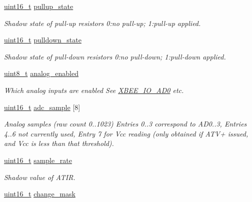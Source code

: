 \begin{DoxyCompactItemize}
\hyperlink{group__hal__dos_ga5a8b2dc9e45a9ee81a94ef304fb62505}{uint16\+\_\+t} \hyperlink{group__xbee__io_gae74f9326ff51e03bd7ae5d2c85c08f9e}{pullup\+\_\+state}
\begin{DoxyCompactList}\small\item\em Shadow state of pull-\/up resistors 0\+:no pull-\/up; 1\+:pull-\/up applied. \end{DoxyCompactList}\item 
\hyperlink{group__hal__dos_ga5a8b2dc9e45a9ee81a94ef304fb62505}{uint16\+\_\+t} \hyperlink{group__xbee__io_gab7b8b762841906ebf44fe90a3194d20c}{pulldown\+\_\+state}
\begin{DoxyCompactList}\small\item\em Shadow state of pull-\/down resistors 0\+:no pull-\/down; 1\+:pull-\/down applied. \end{DoxyCompactList}\item 
\hyperlink{group__hal__dos_gae1affc9ca37cfb624959c866a73f83c2}{uint8\+\_\+t} \hyperlink{group__xbee__io_ga8473837f97f54ee29f09cd8f9c15e084}{analog\+\_\+enabled}
\begin{DoxyCompactList}\small\item\em Which analog inputs are enabled See \hyperlink{group__xbee__io_gafc56816e62b0dd0a8d981b08f5f29651}{X\+B\+E\+E\+\_\+\+I\+O\+\_\+\+A\+D0} etc. \end{DoxyCompactList}\item 
\hyperlink{group__hal__dos_ga5a8b2dc9e45a9ee81a94ef304fb62505}{uint16\+\_\+t} \hyperlink{group__xbee__io_ga51a638af480039b3c6578b36b5ad44f0}{adc\+\_\+sample} \mbox{[}8\mbox{]}
\begin{DoxyCompactList}\small\item\em Analog samples (raw count 0..1023) Entries 0..3 correspond to A\+D0..3, Entries 4..6 not currently used, Entry 7 for Vcc reading (only obtained if A\+T\+V+ issued, and Vcc is less than that threshold). \end{DoxyCompactList}\item 
\hyperlink{group__hal__dos_ga5a8b2dc9e45a9ee81a94ef304fb62505}{uint16\+\_\+t} \hyperlink{group__xbee__io_ga55f35df829432e5948124c79e1cda4d9}{sample\+\_\+rate}
\begin{DoxyCompactList}\small\item\em Shadow value of A\+T\+IR. \end{DoxyCompactList}\item 
\hyperlink{group__hal__dos_ga5a8b2dc9e45a9ee81a94ef304fb62505}{uint16\+\_\+t} \hyperlink{group__xbee__io_ga2502e2e5a62801d202ac0cb63e546e46}{change\+\_\+mask}

\end{DoxyCompactItemize}

